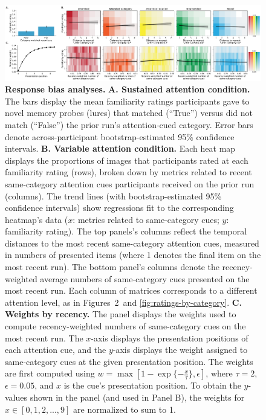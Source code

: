 \documentclass{article}
\newcommand{\familiarity}{2}
\begin{document}
\begin{figure}[tp]
  \centering
  \includegraphics[width=1\textwidth]{figs/response_bias.pdf}

\caption{\textbf{Response bias analyses.} \textbf{A. Sustained attention
condition.} The bars display the mean familiarity ratings participants gave to
novel memory probes (lures) that matched (``True'') versus did not match
(``False'') the prior run's attention-cued category. Error bars denote
across-participant bootstrap-estimated 95\% confidence intervals. \textbf{B.
Variable attention condition.} Each heat map displays the proportions of images
that participants rated at each familiarity rating (rows), broken down by
metrics related to recent same-category attention cues participants received on
the prior run (columns). The trend lines (with bootstrap-estimated 95\%
confidence intervals) show regressions fit to the corresponding heatmap's data
($x$: metrics related to same-category cues; $y$: familiarity rating). The top
panels's columns reflect the temporal distances to the most recent
same-category attention cues, measured in numbers of presented items (where 1
denotes the final item on the most recent run). The bottom panel's columns
denote the recency-weighted average numbers of same-category cues presented on
the most recent run. Each column of matrices corresponds to a different
attention level, as in Figures~\familiarity~and \ref{fig:ratings-by-category}.
\textbf{C. Weights by recency.} The panel displays the weights used to compute
recency-weighted numbers of same-category cues on the most recent run. The
$x$-axis displays the presentation positions of each attention cue, and the
$y$-axis displays the weight assigned to same-category cues at the given
presentation position. The weights are first computed using $w = \max\left[1 -
\exp\{-\frac{x}{\tau}\} , \epsilon \right]$, where $\tau = 2$, $\epsilon =
0.05$, and $x$ is the cue's presentation position. To obtain the $y$-values
shown in the panel (and used in Panel B), the weights for $x \in \left[0, 1, 2,
..., 9\right]$ are normalized to sum to 1.}

\label{fig:response-bias}
\end{figure}
\end{document}
